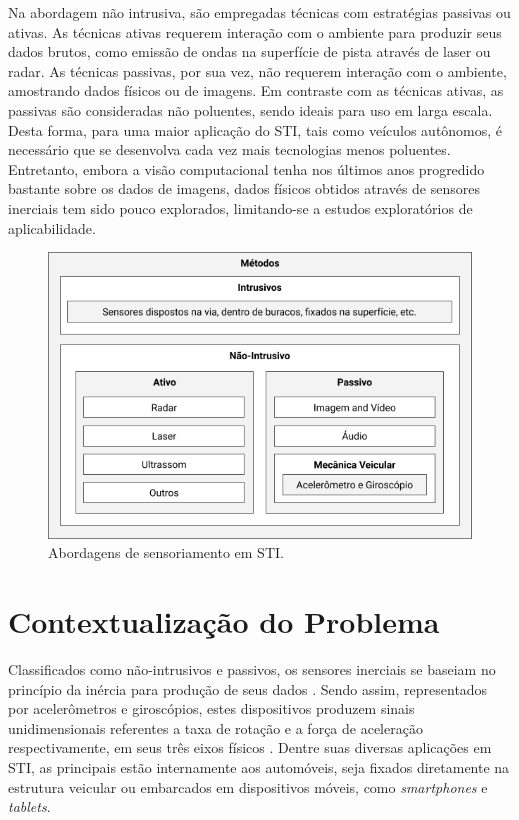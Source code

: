 Na abordagem não intrusiva, são empregadas técnicas com estratégias passivas ou ativas. As técnicas ativas requerem interação com o ambiente para produzir seus dados brutos, como emissão de ondas na superfície de pista através de laser ou radar. As técnicas passivas, por sua vez, não requerem interação com o ambiente, amostrando dados físicos ou de imagens. Em contraste com as técnicas ativas, as passivas são consideradas não poluentes, sendo ideais para uso em larga escala. Desta forma, para uma maior aplicação do STI, tais como veículos autônomos, é necessário que se desenvolva cada vez mais tecnologias menos poluentes. Entretanto, embora a visão computacional tenha nos últimos anos progredido bastante sobre os dados de imagens, dados físicos obtidos através de sensores inerciais tem sido pouco explorados, limitando-se a estudos exploratórios de aplicabilidade.

\begin{figure}[t]
  \centering
  \caption{Abordagens de sensoriamento em STI.}
  \label{fig:classificacao_sensores}
  \includegraphics[width=0.9\linewidth]{figuras/fig1.png}
\end{figure}

\section{Contextualização do Problema}

Classificados como não-intrusivos e passivos, os sensores inerciais se baseiam no princípio da inércia para produção de seus dados \cite{Braga2017}. Sendo assim, representados por acelerômetros e giroscópios, estes dispositivos produzem sinais unidimensionais referentes a taxa de rotação e a força de aceleração respectivamente, em seus três eixos físicos \cite{Groves2013}. Dentre suas diversas aplicações em STI, as principais estão internamente aos automóveis, seja fixados diretamente na estrutura veicular ou embarcados em dispositivos móveis, como \textit{smartphones} e \textit{tablets}.

